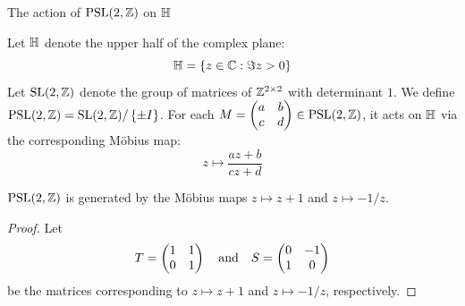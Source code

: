 \begin{hyperbolicbox}{The action of $\operatorname{PSL}(2,\mathbb{Z})$ on $\mathbb{H}$}
        \small

        \begin{defi}
            Let $\mathbb{H}$ denote the upper half of the complex plane:
            $$
            \mathbb{H}=\left\{z\in\mathbb{C}:\Im z>0\right\}
            $$
            Let $\operatorname{SL}(2,\mathbb{Z})$ denote the group of matrices of $\mathbb{Z}^{2\times 2}$ with determinant $1$. We define $\operatorname{PSL}(2,\mathbb{Z})=\operatorname{SL}(2,\mathbb{Z})/\left\{\pm I\right\}$. For each $M=\begin{pmatrix}
                a&b\\c&d
            \end{pmatrix}\in\operatorname{PSL}(2,\mathbb{Z})$, it acts on $\mathbb{H}$ via the corresponding M\"obius map:
            $$
            z\mapsto\frac{az+b}{cz+d}
            $$
        \end{defi}

        \begin{thm}
            $\operatorname{PSL}(2,\mathbb{Z})$ is generated by the M\"obius maps $z\mapsto z+1$ and $z\mapsto-1/z$.
        \end{thm}
        \begin{proof}
            Let
            $$
            T=\begin{pmatrix}
                1&1\\0&1
            \end{pmatrix}\quad\text{and}\quad
            S=\begin{pmatrix}
                0&-1\\1&0
            \end{pmatrix}
            $$
            be the matrices corresponding to $z\mapsto z+1$ and $z\mapsto-1/z$, respectively.
            

\end{proof}
\end{hyperbolicbox}
